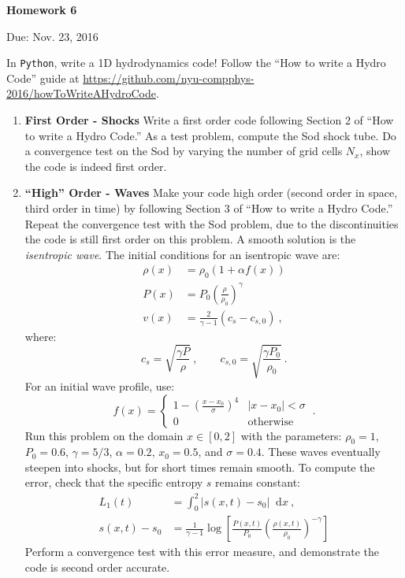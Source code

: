 \documentclass{article}
\newcommand{\Python}{{\texttt{Python}}}
\newcommand*\diff{\mathop{}\!\mathrm{d}}
\begin{document}
\begin{center}

\vspace*{-2.5cm}
\LARGE
\bf{Homework 6}
\vspace{1cm}

\large{Due: Nov. 23, 2016}
\vspace{1cm}

\end{center}

In \Python{}, write a 1D hydrodynamics code!  Follow the ``How to write a Hydro Code'' guide at \url{https://github.com/nyu-compphys-2016/howToWriteAHydroCode}.

\begin{enumerate}
	\item {\bf First Order - Shocks} 
		Write a first order code following Section 2 of ``How to write a Hydro Code.'' As a test problem, compute the Sod shock tube.  Do a convergence test on the Sod by varying the number of grid cells $N_x$, show the code is indeed first order.
	\item {\bf ``High'' Order - Waves} 
		Make your code high order (second order in space, third order in time) by following Section 3 of  ``How to write a Hydro Code.''  Repeat the convergence test with the Sod problem, due to the discontinuities the code is still first order on this problem.  A smooth solution is the \emph{isentropic wave}.  The initial conditions for an isentropic wave are:
		\begin{align}
			\rho(x) &= \rho_0 \left( 1 + \alpha f(x) \right) \\
			P(x) &= P_0 \left(\frac{\rho}{\rho_0}\right)^\gamma \\
			v(x) &= \frac{2}{\gamma-1} \left( c_s - c_{s,0} \right) \ ,
		\end{align}
		where:
		\begin{equation}
			c_s = \sqrt{\frac{\gamma P}{\rho}} \ , \qquad c_{s,0} = \sqrt{\frac{\gamma P_0}{\rho_0}} \ .
		\end{equation}
		For an initial wave profile, use:
		\begin{equation}
			f(x) = \left \{ \begin{matrix} 
						1-\left(\frac{x-x_0}{\sigma}\right)^4 & |x-x_0| < \sigma \\
						0 & \text{otherwise}
					\end{matrix} \right . \ .
		\end{equation}
		Run this problem on the domain $x \in [0,2]$ with the parameters: $\rho_0 = 1$, $P_0=0.6$, $\gamma=5/3$, $\alpha=0.2$, $x_0=0.5$, and $\sigma=0.4$.  
		These waves eventually steepen into shocks, but for short times remain smooth.  To compute the error, check that the specific entropy $s$ remains constant:
		\begin{align}
			L_1(t) & = \int_0^2 |s(x,t) - s_0| \diff x \ , \\
			s(x,t)-s_0 &= \frac{1}{\gamma-1} \log \left[\frac{P(x,t)}{P_0} \left(\frac{\rho(x,t)}{\rho_0}\right)^{-\gamma}\right]
		\end{align}
		Perform a convergence test with this error measure, and demonstrate the code is second order accurate.
\end{enumerate}
\end{document}

